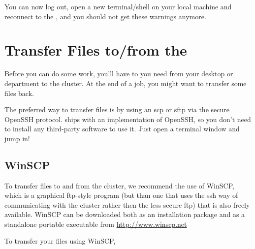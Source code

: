 \begin{prompt}
\end{prompt}

You can now log out, open a new terminal/shell on your local machine and reconnect to the \hpc, and you should not get these
warnings anymore.

\fi
\section{Transfer Files to/from the \hpc}

Before you can do some work, you'll have to 
you need from your desktop or department to the cluster. At the end of a job,
you might want to transfer some files back.

\ifmacORlinux
The preferred way to transfer files is by using an scp or sftp via the secure
OpenSSH protocol.  \OS  ships with an implementation of
OpenSSH, so you don't need to install any third-party software to use it. Just
open a terminal window and jump in!
\fi

\ifwindows
  \subsection{WinSCP}

  To transfer files to and from the cluster, we recommend the use of WinSCP,
  which is a graphical ftp-style program (but than one that uses the ssh way of
  communicating with the cluster rather then the less secure ftp) that is also
  freely available. WinSCP can be downloaded both as an installation package
  and as a standalone portable executable from \url{http://www.winscp.net}

  To transfer your files using WinSCP,


